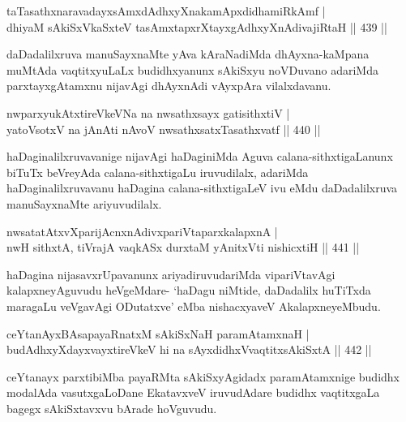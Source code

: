 \begin{shl}
taTasathxnaravadayxsAmxdAdhxyXnakamApxdidhamiRkAmf | \\
dhiyaM sAkiSxVkaSxteV tasAmxtapxrXtayxgAdhxyXnAdivajiRtaH \hfill||  439 ||  
\end{shl}

\begin{artha}
daDadalilxruva manuSayxnaMte yAva kAraNadiMda dhAyxna-kaMpana muMtAda vaqtitxyuLaLx budidhxyanunx sAkiSxyu noVDuvano adariMda parxtayxgAtamxnu nijavAgi dhAyxnAdi vAyxpAra vilalxdavanu.
\end{artha}


\begin{shl}
nwparxyukAtxtireVkeVNa na nwsathxsayx gatisithxtiV | \\
yatoV\s sotxV na jAnAti nAvoV nwsathxsatxTasathxvatf \hfill||  440 ||  
\end{shl}

\begin{artha}
haDaginalilxruvavanige nijavAgi haDaginiMda Aguva calana-sithxtigaLanunx biTuTx beVreyAda calana-sithxtigaLu iruvudilalx, adariMda haDaginalilxruvavanu haDagina calana-sithxtigaLeV ivu eMdu daDadalilxruva manuSayxnaMte ariyuvudilalx.
\end{artha}

\begin{shl}
nwsatatAtxvXparijAcnxnAdivxpariVtaparxkalapxnA | \\
nwH sithxtA, tiVrajA vaqkASx durxtaM yAnitxVti nishicxtiH \hfill||  441 ||  
\end{shl}

\begin{artha}
haDagina nijasavxrUpavanunx ariyadiruvudariMda vipariVtavAgi kalapxneyAguvudu heVgeMdare- `haDagu niMtide, daDadalilx huTiTxda maragaLu veVgavAgi ODutatxve' eMba nishacxyaveV AkalapxneyeMbudu.
\end{artha}


\begin{shl}
ceYtanAyxBAsapayaRnatxM sAkiSxNaH paramAtamxnaH | \\
budAdhxyXdayxvayxtireVkeV hi na sAyxdidhxVvaqtitxsAkiSxtA \hfill||  442 ||  
\end{shl}

\begin{artha}
ceYtanayx parxtibiMba payaRMta sAkiSxyAgidadx paramAtamxnige budidhx modalAda vasutxgaLoDane EkatavxveV iruvudAdare budidhx vaqtitxgaLa bagegx sAkiSxtavxvu bArade hoVguvudu.
\end{artha}

